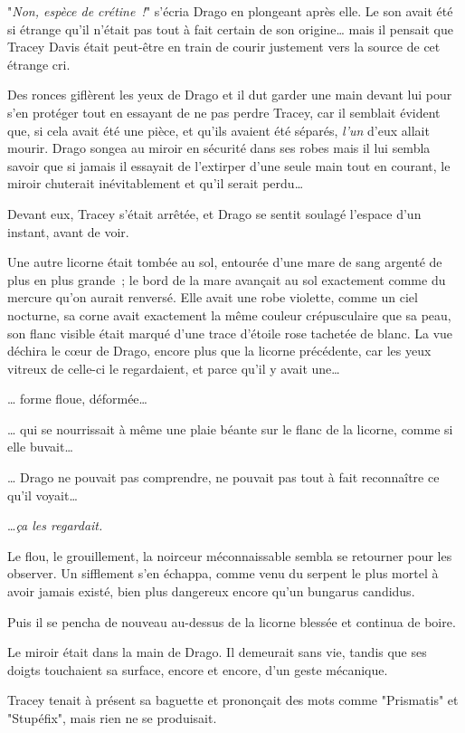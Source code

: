 "\emph{Non, espèce de crétine~!}" s'écria Drago en plongeant après elle. Le son avait été si étrange qu'il n'était pas tout à fait certain de son origine… mais il pensait que Tracey Davis était peut-être en train de courir justement vers la source de cet étrange cri.

Des ronces giflèrent les yeux de Drago et il dut garder une main devant lui pour s'en protéger tout en essayant de ne pas perdre Tracey, car il semblait évident que, si cela avait été une pièce, et qu'ils avaient été séparés, \emph{l'un} d'eux allait mourir. Drago songea au miroir en sécurité dans ses robes mais il lui sembla savoir que si jamais il essayait de l'extirper d'une seule main tout en courant, le miroir chuterait inévitablement et qu'il serait perdu…

Devant eux, Tracey s'était arrêtée, et Drago se sentit soulagé l'espace d'un instant, avant de voir.

Une autre licorne était tombée au sol, entourée d'une mare de sang argenté de plus en plus grande~; le bord de la mare avançait au sol exactement comme du mercure qu'on aurait renversé. Elle avait une robe violette, comme un ciel nocturne, sa corne avait exactement la même couleur crépusculaire que sa peau, son flanc visible était marqué d'une trace d'étoile rose tachetée de blanc. La vue déchira le cœur de Drago, encore plus que la licorne précédente, car les yeux vitreux de celle-ci le regardaient, et parce qu'il y avait une…

… forme floue, déformée…

… qui se nourrissait à même une plaie béante sur le flanc de la licorne, comme si elle buvait…

… Drago ne pouvait pas comprendre, ne pouvait pas tout à fait reconnaître ce qu'il voyait…

…\emph{ça les regardait.}

Le flou, le grouillement, la noirceur méconnaissable sembla se retourner pour les observer. Un sifflement s'en échappa, comme venu du serpent le plus mortel à avoir jamais existé, bien plus dangereux encore qu'un bungarus candidus.

Puis il se pencha de nouveau au-dessus de la licorne blessée et continua de boire.

Le miroir était dans la main de Drago. Il demeurait sans vie, tandis que ses doigts touchaient sa surface, encore et encore, d'un geste mécanique.

Tracey tenait à présent sa baguette et prononçait des mots comme "Prismatis" et "Stupéfix", mais rien ne se produisait.

